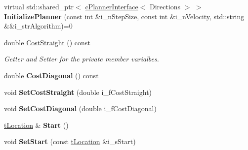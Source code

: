 \begin{DoxyCompactItemize}
\item 
\mbox{\label{classplanner_1_1c_rover_interface_a7fedea18832ad850de1a2589fdca88b7}} 
virtual std\+::shared\+\_\+ptr$<$ \mbox{\hyperlink{classplanner_1_1c_planner_interface}{c\+Planner\+Interface}}$<$ Directions $>$ $>$ {\bfseries Initialize\+Planner} (const int \&i\+\_\+n\+Step\+Size, const int \&i\+\_\+n\+Velocity, std\+::string \&\&i\+\_\+str\+Algorithm)=0
\item 
\mbox{\label{classplanner_1_1c_rover_interface_ad2b552aaf43f7ce5af340d05b5657267}} 
double \mbox{\hyperlink{classplanner_1_1c_rover_interface_ad2b552aaf43f7ce5af340d05b5657267}{Cost\+Straight}} () const
\begin{DoxyCompactList}\small\item\em Getter and Setter for the private member varialbes. \end{DoxyCompactList}\item 
\mbox{\label{classplanner_1_1c_rover_interface_ab4c45b0f0c586f864a83ba90be06efd0}} 
double {\bfseries Cost\+Diagonal} () const
\item 
\mbox{\label{classplanner_1_1c_rover_interface_ac2f57f4b9bf2c01fbcf1ca3c6d1fc55d}} 
void {\bfseries Set\+Cost\+Straight} (double i\+\_\+f\+Cost\+Straight)
\item 
\mbox{\label{classplanner_1_1c_rover_interface_a3aa2779928912477dcf76c7767ea746d}} 
void {\bfseries Set\+Cost\+Diagonal} (double i\+\_\+f\+Cost\+Diagonal)
\item 
\mbox{\label{classplanner_1_1c_rover_interface_ad62c6dcbe7c8194c6a93ca1fc29ee4b8}} 
\mbox{\hyperlink{structplanner_1_1t_location}{t\+Location}} \& {\bfseries Start} ()
\item 
\mbox{\label{classplanner_1_1c_rover_interface_a29669ceb2b1f4cebf0953b59e3c8936a}} 
void {\bfseries Set\+Start} (const \mbox{\hyperlink{structplanner_1_1t_location}{t\+Location}} \&i\+\_\+s\+Start)
\item 

\end{DoxyCompactItemize}
